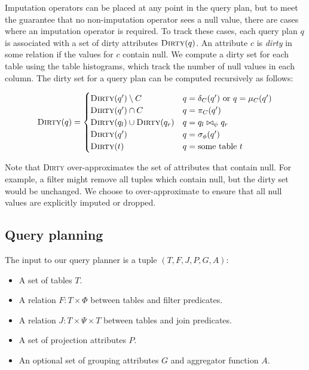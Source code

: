 Imputation operators can be placed at any point in the query plan, but to meet the guarantee that no non-imputation operator sees a null value, there are cases where an imputation operator is required. To track these cases, each query plan $q$ is associated with a set of dirty attributes $\textsc{Dirty}(q)$. An attribute $c$ is \emph{dirty} in some relation if the values for $c$ contain null. We compute a dirty set for each table using the table histograms, which track the number of null values in each column. The dirty set for a query plan can be computed recursively as follows:

\begin{align*}
  \textsc{Dirty}(q) = \begin{cases}
    \textsc{Dirty}(q') \setminus C & q = \delta_C(q')\ \text{or}\ q = \mu_C(q') \\
    \textsc{Dirty}(q') \cap C & q = \pi_C(q') \\
    \textsc{Dirty}(q_l) \cup \textsc{Dirty}(q_r) & q = q_l \bowtie_\psi q_r \\
    \textsc{Dirty}(q') & q = \sigma_\phi(q') \\
    \textsc{Dirty}(t) & q = \text{some table}\ t \\
  \end{cases}
\end{align*}

Note that \textsc{Dirty} over-approximates the set of attributes that contain null. For example, a filter might remove all tuples which contain null, but the dirty set would be unchanged. We choose to over-approximate to ensure that all null values are explicitly imputed or dropped.

\subsection{Query planning}
\label{sec:planning}
The input to our query planner is a tuple $(T, F, J, P, G, A)$:
\begin{itemize}
\item A set of tables $T$.
\item A relation $F: T \times \Phi$ between tables and filter predicates.
\item A relation $J : T \times \Psi \times T$ between tables and join predicates.
\item A set of projection attributes $P$.
\item An optional set of grouping attributes $G$ and aggregator function $A$.
\end{itemize}

